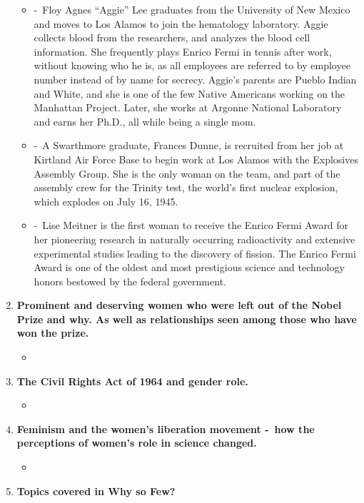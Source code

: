 \documentclass[12pt,a4paper]{article}
\begin{document}
\begin{enumerate}
\begin{itemize}
      \item[]  -\ Floy Agnes ``Aggie'' Lee graduates from the University of New Mexico and moves to Los Alamos to join the hematology laboratory. Aggie collects blood from the researchers, and analyzes the blood cell information. She frequently plays Enrico Fermi in tennis after work, without knowing who he is, as all employees are referred to by employee number instead of by name for secrecy. Aggie's parents are Pueblo Indian and White, and she is one of the few Native Americans working on the Manhattan Project. Later, she works at Argonne National Laboratory and earns her Ph.D., all while being a single mom.
      \item[]  -\ A Swarthmore graduate, Frances Dunne, is recruited from her job at Kirtland Air Force Base to begin work at Los Alamos with the Explosives Assembly Group. She is the only woman on the team, and part of the assembly crew for the Trinity test, the world's first nuclear explosion, which explodes on July 16, 1945.
      \item[]  -\ Lise Meitner is the first woman to receive the Enrico Fermi Award for her pioneering research in naturally occurring radioactivity and extensive experimental studies leading to the discovery of fission. The Enrico Fermi Award is one of the oldest and most prestigious science and technology honors bestowed by the federal government. 
    \end{itemize}
    \item \textbf{Prominent and deserving women who were left out of the Nobel Prize and why. As well as relationships seen among those who have won the prize.}
    \begin{itemize}
      \item[]
    \end{itemize}
    \item \textbf{The Civil Rights Act of 1964 and gender role.}
    \begin{itemize}
      \item[] 
    \end{itemize}
    \item \textbf{Feminism and the women’s liberation movement -\ how the perceptions of women's role in science changed.}
    \begin{itemize}
      \item[] 
    \end{itemize}
    \item \textbf{Topics covered in Why so Few?}
    \begin{itemize} 

\end{itemize}
\end{enumerate}
\end{document}
